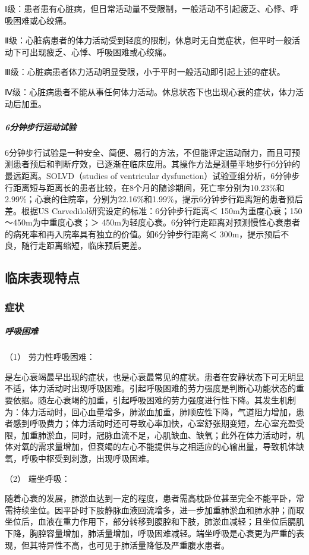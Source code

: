 Ⅰ级：患者患有心脏病，但日常活动量不受限制，一般活动不引起疲乏、心悸、呼吸困难或心绞痛。

Ⅱ级：心脏病患者的体力活动受到轻度的限制，休息时无自觉症状，但平时一般活动下可出现疲乏、心悸、呼吸困难或心绞痛。

Ⅲ级：心脏病患者体力活动明显受限，小于平时一般活动即引起上述的症状。

Ⅳ级：心脏病患者不能从事任何体力活动。休息状态下也出现心衰的症状，体力活动后加重。

\subparagraph{6分钟步行运动试验}

6分钟步行试验是一种安全、简便、易行的方法，不但能评定运动耐力，而且可预测患者预后和判断疗效，已逐渐在临床应用。其操作方法是测量平地步行6分钟的最远距离。SOLVD（studies
of ventricular
dysfunction）试验亚组分析，6分钟步行距离短与距离长的患者比较，在8个月的随诊期间，死亡率分别为10.23\%和2.99\%；心衰的住院率，分别为22.16\%和1.99\%，提示6分钟步行距离短的患者预后差。根据US
Carvedilol研究设定的标准：6分钟步行距离＜
150m为重度心衰；150～450m为中重度心衰；＞
450m为轻度心衰。6分钟行走距离对预测慢性心衰患者的病死率和再入院率具有独立的价值。如6分钟步行距离＜
300m，提示预后不良，随行走距离缩短，临床预后更差。

\subsection{临床表现特点}

\subsubsection{症状}

\subparagraph{呼吸困难}

\hypertarget{text00073.htmlux5cux23CHP3-3-2-3-1-1-1}{}
（1） 劳力性呼吸困难：

是左心衰竭最早出现的症状，也是心衰最常见的症状。患者在安静状态下可无明显不适，体力活动时出现呼吸困难。引起呼吸困难的劳力强度是判断心功能状态的重要依据。随左心衰竭的加重，引起呼吸困难的劳力强度进行性下降。其发生机制为：体力活动时，回心血量增多，肺淤血加重，肺顺应性下降，气道阻力增加，患者感到呼吸费力；体力活动时还可导致心率加快，心室舒张期变短，左心室充盈受限，加重肺淤血，同时，冠脉血流不足，心肌缺血、缺氧；此外在体力活动时，机体对氧的需求量增加，但衰竭的左心不能提供与之相适应的心输出量，导致机体缺氧，呼吸中枢受到刺激，出现呼吸困难。

\hypertarget{text00073.htmlux5cux23CHP3-3-2-3-1-1-2}{}
（2） 端坐呼吸：

随着心衰的发展，肺淤血达到一定的程度，患者需高枕卧位甚至完全不能平卧，常需持续坐位。因平卧时下肢静脉血液回流增多，进一步加重肺淤血和肺水肿；而取坐位后，血液在重力作用下，部分转移到腹腔和下肢，肺淤血减轻；且坐位后膈肌下降，胸腔容量增加，肺活量增加，呼吸困难减轻。端坐呼吸是心衰更为严重的表现，但其特异性不高，也可见于肺活量降低及严重腹水患者。

